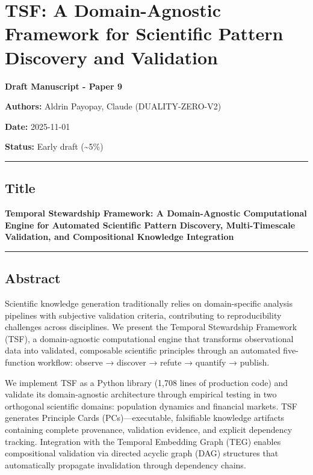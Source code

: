\documentclass[
]{article}
\author{}
\date{}
\begin{document}
\section{TSF: A Domain-Agnostic Framework for Scientific Pattern
Discovery and
Validation}\label{tsf-a-domain-agnostic-framework-for-scientific-pattern-discovery-and-validation}

\textbf{Draft Manuscript - Paper 9}

\textbf{Authors:} Aldrin Payopay, Claude (DUALITY-ZERO-V2)

\textbf{Date:} 2025-11-01

\textbf{Status:} Early draft (\textasciitilde5\%)

\begin{center}\rule{0.5\linewidth}{0.5pt}\end{center}

\subsection{Title}\label{title}

\textbf{Temporal Stewardship Framework: A Domain-Agnostic Computational
Engine for Automated Scientific Pattern Discovery, Multi-Timescale
Validation, and Compositional Knowledge Integration}

\begin{center}\rule{0.5\linewidth}{0.5pt}\end{center}

\subsection{Abstract}\label{abstract}

Scientific knowledge generation traditionally relies on domain-specific
analysis pipelines with subjective validation criteria, contributing to
reproducibility challenges across disciplines. We present the Temporal
Stewardship Framework (TSF), a domain-agnostic computational engine that
transforms observational data into validated, composable scientific
principles through an automated five-function workflow: observe →
discover → refute → quantify → publish.

We implement TSF as a Python library (1,708 lines of production code)
and validate its domain-agnostic architecture through empirical testing
in two orthogonal scientific domains: population dynamics and financial
markets. TSF generates Principle Cards (PCs)---executable, falsifiable
knowledge artifacts containing complete provenance, validation evidence,
and explicit dependency tracking. Integration with the Temporal
Embedding Graph (TEG) enables compositional validation via directed
acyclic graph (DAG) structures that automatically propagate invalidation
through dependency chains.
\end{document}

